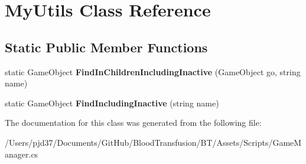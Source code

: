 \hypertarget{class_my_utils}{}\section{My\+Utils Class Reference}
\label{class_my_utils}
\subsection*{Static Public Member Functions}
\begin{DoxyCompactItemize}
\item 
static Game\+Object {\bfseries Find\+In\+Children\+Including\+Inactive} (Game\+Object go, string name)\hypertarget{class_my_utils_a612ec99a2e39fa72727589ae5ed1bcfd}{}\label{class_my_utils_a612ec99a2e39fa72727589ae5ed1bcfd}

\item 
static Game\+Object {\bfseries Find\+Including\+Inactive} (string name)\hypertarget{class_my_utils_aa1d384e874f5ba79c3f9a917ecbba8e9}{}\label{class_my_utils_aa1d384e874f5ba79c3f9a917ecbba8e9}

\end{DoxyCompactItemize}


The documentation for this class was generated from the following file\+:\begin{DoxyCompactItemize}
\item 
/\+Users/pjd37/\+Documents/\+Git\+Hub/\+Blood\+Transfusion/\+B\+T/\+Assets/\+Scripts/Game\+Manager.\+cs\end{DoxyCompactItemize}
